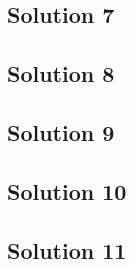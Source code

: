 \subsection{Solution 7}

\newpage

\subsection{Solution 8}

\newpage

\subsection{Solution 9}

\newpage

\subsection{Solution 10}

\newpage

\subsection{Solution 11}

\newpage